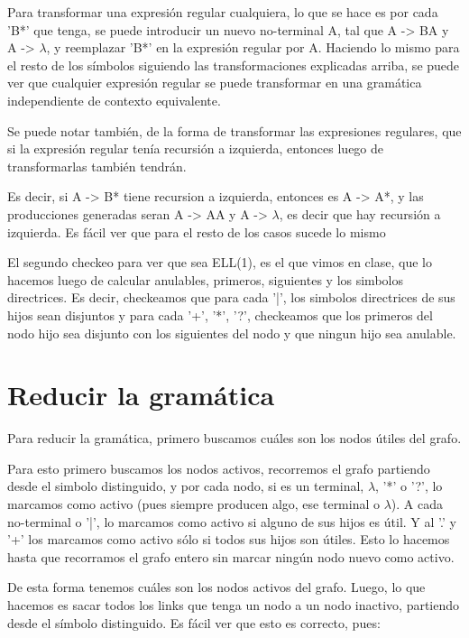 \documentclass[a4paper]{report}
\begin{document}
Para transformar una expresión regular cualquiera, lo que se hace es por cada
'B*' que tenga, se puede introducir un nuevo no-terminal A, tal que A -> BA y A
-> $\lambda$, y reemplazar 'B*' en la expresión regular por A. Haciendo lo mismo para el
resto de los símbolos siguiendo las transformaciones explicadas arriba, se puede
ver que cualquier expresión regular se puede transformar en una gramática
independiente de contexto equivalente.


Se puede notar también, de la forma de transformar las expresiones regulares,
que si la expresión regular tenía recursión a izquierda, entonces luego de
transformarlas también tendrán.


Es decir, si A -> B* tiene recursion a izquierda, entonces es A -> A*, y las
producciones generadas seran A -> AA y A -> $\lambda$, es decir que hay recursión a
izquierda. Es fácil ver que para el resto de los casos sucede lo mismo


El segundo checkeo para ver que sea ELL(1), es el que vimos en clase, que lo
hacemos luego de calcular anulables, primeros, siguientes y los simbolos
directrices. Es decir, checkeamos que para cada '|', los simbolos directrices de
sus hijos sean disjuntos y para cada '+', '*', '?', checkeamos que los primeros
del nodo hijo sea disjunto con los siguientes del nodo y que ningun hijo sea
anulable.


\section*{Reducir la gramática}

	Para reducir la gramática, primero buscamos cuáles son los nodos útiles
del grafo.


	Para esto primero buscamos los nodos activos, recorremos el grafo partiendo desde el
simbolo distinguido, y por cada nodo, si es un terminal, $\lambda$, '*' o '?', lo
marcamos como activo (pues siempre producen algo, ese terminal o $\lambda$). A cada
no-terminal o '|', lo marcamos como activo si alguno de sus hijos es útil. Y al
'.' y '+' los marcamos como activo sólo si todos sus hijos son útiles. Esto lo
hacemos hasta que recorramos el grafo entero sin marcar ningún nodo nuevo como activo.


	De esta forma tenemos cuáles son los nodos activos del grafo. Luego, lo
que hacemos es sacar todos los links que tenga un nodo a un nodo inactivo,
partiendo desde el símbolo distinguido. Es fácil ver que esto es correcto, pues:
\end{document}
